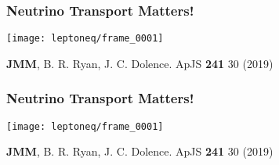 \documentclass[]{beamer}
\begin{document}
\begin{frame}
  \frametitle{Neutrino Transport Matters!}
  \begin{center}
    \texttt{[image: leptoneq/frame\_0001]}
  \end{center}
  \begin{tiny}
    \textbf{JMM}, B. R. Ryan, J. C. Dolence. ApJS \textbf{241} 30 (2019) 
  \end{tiny}
\end{frame}

\begin{frame}
  \frametitle{Neutrino Transport Matters!}
  \begin{center}
    \texttt{[image: leptoneq/frame\_0001]}
  \end{center}
  \begin{tiny}
    \textbf{JMM}, B. R. Ryan, J. C. Dolence. ApJS \textbf{241} 30 (2019) 
  \end{tiny}
\end{frame}
\end{document}
